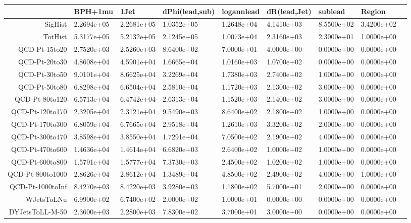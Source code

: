 \begin{landscape}
\begin{table}[htb]
\begin{tabular}{rllllllll}

 \hline 
&BPH+1mu & 1Jet & dPhi(lead,sub) & logannlead & dR(lead,Jet) & sublead & Region \\
 \hline 
 \hline 
SigHist&2.2694e+05&2.2681e+05&1.0352e+05&1.2648e+04&4.1410e+03&8.5500e+02&3.4200e+02\\
 \hline 
TotHist&5.3177e+05&5.2132e+05&2.1245e+05&1.0073e+04&2.3160e+03&2.3000e+01&1.0000e+00\\
 \hline 
QCD-Pt-15to20&2.7520e+03&2.5260e+03&8.6400e+02&7.0000e+01&4.0000e+00&0.0000e+00&0.0000e+00\\
 \hline 
QCD-Pt-20to30&4.8608e+04&4.5901e+04&1.6665e+04&1.0160e+03&1.0700e+02&0.0000e+00&0.0000e+00\\
 \hline 
QCD-Pt-30to50&9.0101e+04&8.6625e+04&3.2269e+04&1.7380e+03&2.7400e+02&1.0000e+00&0.0000e+00\\
 \hline 
QCD-Pt-50to80&6.8298e+04&6.6504e+04&2.5810e+04&1.1720e+03&2.1300e+02&3.0000e+00&0.0000e+00\\
 \hline 
QCD-Pt-80to120&6.5713e+04&6.4742e+04&2.6313e+04&1.1520e+03&2.1400e+02&3.0000e+00&0.0000e+00\\
 \hline 
QCD-Pt-120to170&2.3205e+04&2.3121e+04&9.5490e+03&8.6400e+02&2.1800e+02&1.0000e+00&0.0000e+00\\
 \hline 
QCD-Pt-170to300&6.8059e+04&6.7665e+04&2.9518e+04&1.2610e+03&3.3200e+02&2.0000e+00&0.0000e+00\\
 \hline 
QCD-Pt-300to470&3.8598e+04&3.8550e+04&1.7291e+04&7.0500e+02&2.1900e+02&4.0000e+00&0.0000e+00\\
 \hline 
QCD-Pt-470to600&1.4636e+04&1.4614e+04&6.6820e+03&2.6400e+02&1.0000e+02&1.0000e+00&0.0000e+00\\
 \hline 
QCD-Pt-600to800&1.5791e+04&1.5777e+04&7.3730e+03&2.4500e+02&1.0200e+02&1.0000e+00&0.0000e+00\\
 \hline 
QCD-Pt-800to1000&2.8626e+04&2.8612e+04&1.3489e+04&4.8500e+02&2.4900e+02&4.0000e+00&1.0000e+00\\
 \hline 
QCD-Pt-1000toInf&8.4270e+03&8.4220e+03&3.9280e+03&1.1800e+02&5.7000e+01&2.0000e+00&0.0000e+00\\
 \hline 
WJetsToLNu&6.9900e+02&6.7400e+02&2.0000e+02&1.0000e+01&0.0000e+00&0.0000e+00&0.0000e+00\\
 \hline 
DYJetsToLL-M-50&2.3600e+03&2.2800e+03&7.8300e+02&3.7000e+01&3.0000e+00&0.0000e+00&0.0000e+00\\

\end{tabular}
\end{table}
\end{landscape}
